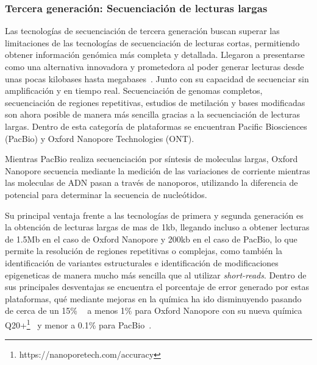 

\subsubsection{Tercera generación: Secuenciación de lecturas largas}
Las tecnologías de secuenciación de tercera generación buscan superar las limitaciones de las tecnologías de secuenciación de lecturas cortas, permitiendo obtener información genómica más completa y detallada. %
Llegaron a presentarse como una alternativa innovadora y prometedora al poder generar lecturas desde unas pocas kilobases hasta megabases~\cite{amarasinghe2020opportunities}. Junto con su capacidad de secuenciar sin amplificación y en tiempo real. 
Secuenciación de genomas completos, secuenciación de regiones repetitivas, estudios de metilación y bases modificadas son ahora posible de manera más sencilla gracias a la secuenciación de lecturas largas. 
Dentro de esta categoría de plataformas se encuentran Pacific Biosciences (PacBio) y Oxford Nanopore Technologies (ONT).

Mientras PacBio realiza secuenciación por síntesis de moleculas largas, %
Oxford Nanopore secuencia mediante la medición de las variaciones de corriente mientras las moleculas de ADN pasan a través de nanoporos, utilizando la diferencia de potencial para determinar la secuencia de nucleótidos.


Su principal ventaja frente a las tecnologías de primera y segunda generación es la obtención de lecturas largas de mas de 1kb, llegando incluso a obtener lecturas de 1.5Mb en el caso de Oxford Nanopore y 200kb en el caso de PacBio, lo que permite la resolución de regiones repetitivas o complejas, como también la identificación de variantes estructurales e identificación de modificaciones epigeneticas de manera mucho más sencilla que al utilizar \textit{short-reads}. 
Dentro de sus principales desventajas se encuentra el porcentaje de error generado por estas plataformas, qué mediante mejoras en la química ha ido disminuyendo pasando de cerca de un 15\% ~\cite{deamer2016three} a menos 1\% para Oxford Nanopore con su nueva química Q20+\footnote{https://nanoporetech.com/accuracy}~\cite{cuber2023comparing} y menor a 0.1\% para PacBio~\cite{cuber2023comparing}.

